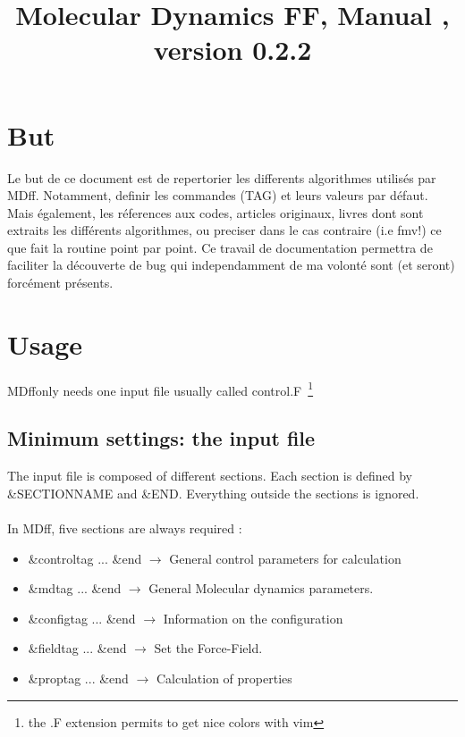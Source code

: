 \documentclass[10pt,a4paper]{article}
\title{Molecular Dynamics FF, Manual , version 0.2.2}
\newcommand{\MDFF}{{\sc MDff}}
\newcommand{\FMV}{{\sc fmv}}
\begin{document}
\maketitle

\clearpage

\section{But}

Le but de ce document est de repertorier les differents 
algorithmes utilis\'es par \MDFF. Notamment, definir les 
commandes (TAG) et leurs valeurs par défaut. Mais également, 
les r\'eferences aux codes, articles originaux, livres dont 
sont extraits les diff\'erents algorithmes, ou preciser dans 
le cas contraire (i.e \FMV!) ce que fait la routine point par point. 
Ce travail de documentation permettra de faciliter la d\'ecouverte
de bug qui independamment de ma volont\'e sont (et seront) 
forc\'ement pr\'esents. 

\clearpage


\section{Usage}

\MDFF only needs one input file usually called control.F~\footnote{the .F extension permits to get nice colors with vim} 

\subsection{Minimum settings: the input file}

The input file is composed of different sections. 
Each section is defined by  \&SECTIONNAME and \&END.
Everything outside the sections is ignored.
\\
\\
In \MDFF, five sections are always required :

\begin{itemize}
\item \&controltag ... \&end $\rightarrow$ General control parameters for calculation 
\item \&mdtag ... \&end      $\rightarrow$ General Molecular dynamics parameters.
\item \&configtag ... \&end  $\rightarrow$ Information on the configuration
\item \&fieldtag ... \&end   $\rightarrow$ Set the Force-Field.
\item \&proptag ... \&end    $\rightarrow$ Calculation of properties
\end{itemize}
\end{document}
